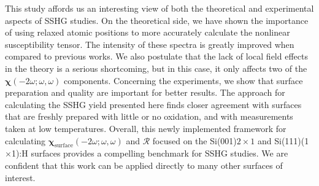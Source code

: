 This study affords us an interesting view of both the theoretical and
experimental aspects of SSHG studies. On the theoretical side, we have shown the
importance of using relaxed atomic positions to more accurately calculate the
nonlinear susceptibility tensor. The intensity of these spectra is greatly
improved when compared to previous works.\cite{mejiaPRB02} We also postulate
that the lack of local field effects in the theory is a serious shortcoming, but
in this case, it only affects two of the
$\boldsymbol{\chi}(-2\omega;\omega,\omega)$ components. Concerning the
experiments, we show that surface preparation and quality are important for
better results. The approach for calculating the SSHG yield presented here finds
closer agreement with surfaces that are freshly prepared with little or no
oxidation, and with measurements taken at low temperatures. Overall, this newly
implemented framework for calculating
$\boldsymbol{\chi}_{\mathrm{surface}}(-2\omega;\omega,\omega)$ and $\mathcal{R}$
focused on the Si(001)$2\times 1$ and  Si(111)(1$\times$1):H surfaces provides a
compelling benchmark for SSHG studies. We are confident that this work can be
applied directly to many other surfaces of interest.

\stopcontents[chapters]
